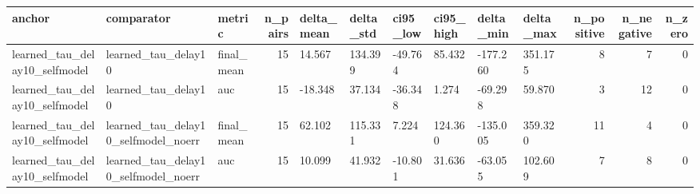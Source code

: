 \begin{tabular}{lllrllllllrrr}
\toprule
anchor & comparator & metric & n_pairs & delta_mean & delta_std & ci95_low & ci95_high & delta_min & delta_max & n_positive & n_negative & n_zero \\
\midrule
learned_tau_delay10_selfmodel & learned_tau_delay10 & final_mean & 15 & 14.567 & 134.399 & -49.764 & 85.432 & -177.260 & 351.175 & 8 & 7 & 0 \\
learned_tau_delay10_selfmodel & learned_tau_delay10 & auc & 15 & -18.348 & 37.134 & -36.348 & 1.274 & -69.298 & 59.870 & 3 & 12 & 0 \\
learned_tau_delay10_selfmodel & learned_tau_delay10_selfmodel_noerr & final_mean & 15 & 62.102 & 115.331 & 7.224 & 124.360 & -135.005 & 359.320 & 11 & 4 & 0 \\
learned_tau_delay10_selfmodel & learned_tau_delay10_selfmodel_noerr & auc & 15 & 10.099 & 41.932 & -10.801 & 31.636 & -63.055 & 102.609 & 7 & 8 & 0 \\
\bottomrule
\end{tabular}
